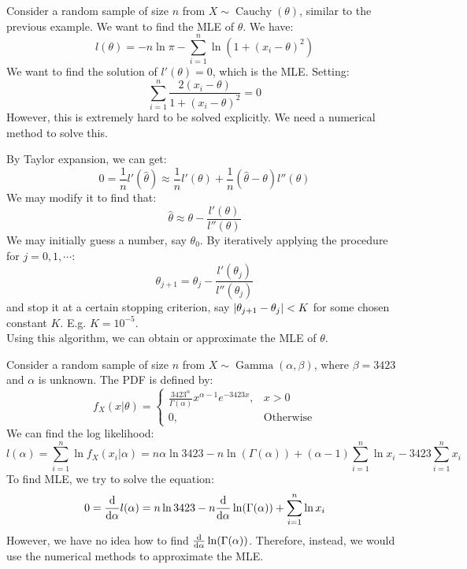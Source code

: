 \documentclass{huhtakm-template-book-v2}
\DeclareMathOperator{\Cauchy}{Cauchy}
\DeclareMathOperator{\Gam}{Gamma}
\begin{document}
\newpage
\begin{eg}
	Consider a random sample of size $n$ from $X\sim\Cauchy(\theta)$, similar to the previous example. We want to find the MLE of $\theta$. We have:
	\begin{equation*}
		l(\theta)=-n\ln{\pi}-\sum_{i=1}^{n}\ln(1+(x_{i}-\theta)^{2})
	\end{equation*}
	We want to find the solution of $l'(\theta)=0$, which is the MLE. Setting:
	\begin{equation*}
		\sum_{i=1}^{n}\frac{2(x_{i}-\theta)}{1+(x_{i}-\theta)^{2}}=0
	\end{equation*}
	However, this is extremely hard to be solved explicitly. We need a numerical method to solve this.
\end{eg}
\begin{eg}
	By Taylor expansion, we can get:
	\begin{equation*}
		0=\frac{1}{n}l'(\hat{\theta})\approx\frac{1}{n}l'(\theta)+\frac{1}{n}(\hat{\theta}-\theta)l''(\theta)
	\end{equation*}
	We may modify it to find that:
	\begin{equation*}
		\hat{\theta}\approx\theta-\frac{l'(\theta)}{l''(\theta)}
	\end{equation*}
	We may initially guess a number, say $\theta_{0}$. By iteratively applying the procedure for $j=0,1,\cdots$:
	\begin{equation*}
		\theta_{j+1}=\theta_{j}-\frac{l'(\theta_{j})}{l''(\theta_{j})}
	\end{equation*}
	and stop it at a certain stopping criterion, say $\left|{\theta_{j+1}-\theta_{j}}\right|<K$ for some chosen constant $K$. E.g. $K=10^{-5}$.\\
	Using this algorithm, we can obtain or approximate the MLE of $\theta$.
\end{eg}
\begin{eg}
	Consider a random sample of size $n$ from $X\sim\Gam(\alpha,\beta)$, where $\beta=3423$ and $\alpha$ is unknown. The PDF is defined by:
	\begin{equation*}
		f_{X}(x|\theta)=\begin{cases}
			\frac{3423^{\alpha}}{\Gamma(\alpha)}x^{\alpha-1}e^{-3423x}, &x>0\\
			0, &\text{Otherwise}
		\end{cases}
	\end{equation*}
	We can find the log likelihood:
	\begin{equation*}
		l(\alpha)=\sum_{i=1}^{n}\ln{f_{X}(x_{i}|\alpha)}=n\alpha\ln{3423}-n\ln(\Gamma(\alpha))+(\alpha-1)\sum_{i=1}^{n}\ln{x_{i}}-3423\sum_{i=1}^{n}x_{i}
	\end{equation*}
	To find MLE, we try to solve the equation:
	\begin{equation*}
		0=\odv*{}{\alpha}l(\alpha)=n\ln{3423}-n\odv*{}{\alpha}\ln(\Gamma(\alpha))+\sum_{i=1}^{n}\ln{x_{i}}
	\end{equation*}
	However, we have no idea how to find $\odv*{}{\alpha}\ln(\Gamma(\alpha))$. Therefore, instead, we would use the numerical methods to approximate the MLE.
\end{eg}
\end{document}
